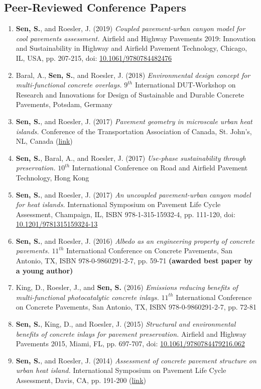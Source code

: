 \documentclass[12pt]{article}
\begin{document}
\subsection*{Peer-Reviewed Conference Papers}
\begin{enumerate}[label=(C\arabic*)]
	\item \textbf{Sen, S.}, and Roesler, J. (2019) \textit{Coupled pavement-urban canyon model for cool pavements assessment.} Airfield and Highway Pavements 2019: Innovation and Sustainability in Highway and Airfield Pavement Technology, Chicago, IL, USA, pp. 207-215, doi: \href{http://dx.doi.org/10.1061/9780784482476}{10.1061/9780784482476}
	\item Baral, A., \textbf{Sen, S.}, and Roesler, J. (2018) \textit{Environmental design concept for multi-functional concrete overlays.} $9^{th}$ International DUT-Workshop on Research and Innovations for Design of Sustainable and Durable Concrete Pavements, Potsdam, Germany
	\item \textbf{Sen, S.}, and Roesler, J. (2017) \textit{Pavement geometry in microscale urban heat islands.} Conference of the Transportation Association of Canada, St. John’s, NL, Canada (\href{http://www.tac-atc.ca/sites/default/files/conf_papers/sens_-_pavement_geometry_in_microscale_urban_heat_islands.pdf}{link})
	\item \textbf{Sen, S.}, Baral, A., and Roesler, J. (2017) \textit{Use-phase sustainability through preservation.} $10^{th}$ International Conference on Road and Airfield Pavement Technology, Hong Kong
	\item \textbf{Sen, S.}, and Roesler, J. (2017) \textit{An uncoupled pavement-urban canyon model for heat islands.} International Symposium on Pavement Life Cycle Assessment, Champaign, IL, ISBN 978-1-315-15932-4, pp. 111-120, doi: \href{http://dx.doi.org/10.1201/9781315159324-13}{10.1201/9781315159324-13}
	\item \textbf{Sen, S.}, and Roesler, J. (2016) \textit{Albedo as an engineering property of concrete pavements.} $11^{th}$ International Conference on Concrete Pavements, San Antonio, TX, ISBN 978-0-9860291-2-7, pp. 59-71 \textbf{(awarded best paper by a young author)}
	\item King, D., Roesler, J., and \textbf{Sen, S.} (2016) \textit{Emissions reducing benefits of multi-functional photocatalytic concrete inlays.} $11^{th}$ International Conference on Concrete Pavements, San Antonio, TX, ISBN 978-0-9860291-2-7, pp. 72-81
	\item \textbf{Sen, S.}, King, D., and Roesler, J. (2015) \textit{Structural and environmental benefits of concrete inlays for pavement preservation.} Airfield and Highway Pavements 2015, Miami, FL, pp. 697-707, doi: \href{http://dx.doi.org/10.1061/9780784479216.062}{10.1061/9780784479216.062}
	\item \textbf{Sen, S.}, and Roesler, J. (2014) \textit{Assessment of concrete pavement structure on urban heat island.} International Symposium on Pavement Life Cycle Assessment, Davis, CA, pp. 191-200 (\href{http://www.ucprc.ucdavis.edu/p-LCA2014/media/pdf/Papers/LCA14_Urban\%20Heat\%20Island.pdf}{link})
\end{enumerate}
\end{document}
